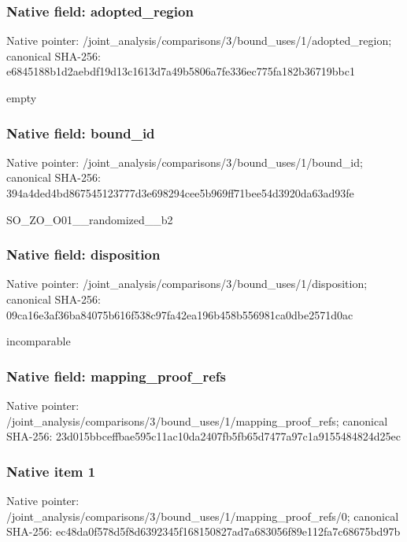 \documentclass[10pt,a4paper]{article}
\begin{document}
\subsubsection{Native field: adopted\_region}


Native pointer: /joint\_analysis/comparis\allowbreak{}ons/3/bound\_uses/1/adopt\allowbreak{}ed\_region; canonical SHA-256: e6845188b1d2aebdf19d13c1\allowbreak{}613d7a49b5806a7fe336ec77\allowbreak{}5fa182b36719bbc1


empty


\subsubsection{Native field: bound\_id}


Native pointer: /joint\_analysis/comparis\allowbreak{}ons/3/bound\_uses/1/bound\allowbreak{}\_id; canonical SHA-256: 394a4ded4bd867545123777d\allowbreak{}3e698294cee5b969ff71bee5\allowbreak{}4d3920da63ad93fe


SO\_ZO\_O01\_\_randomized\_\_b2


\subsubsection{Native field: disposition}


Native pointer: /joint\_analysis/comparis\allowbreak{}ons/3/bound\_uses/1/dispo\allowbreak{}sition; canonical SHA-256: 09ca16e3af36ba84075b616f\allowbreak{}538c97fa42ea196b458b5569\allowbreak{}81ca0dbe2571d0ac


incomparable


\subsubsection{Native field: mapping\_proof\_refs}


Native pointer: /joint\_analysis/comparis\allowbreak{}ons/3/bound\_uses/1/mappi\allowbreak{}ng\_proof\_refs; canonical SHA-256: 23d015bbceffbae595c11ac1\allowbreak{}0da2407fb5fb65d7477a97c1\allowbreak{}a9155484824d25ec



\subsubsection{Native item 1}


Native pointer: /joint\_analysis/comparis\allowbreak{}ons/3/bound\_uses/1/mappi\allowbreak{}ng\_proof\_refs/0; canonical SHA-256: ec48da0f578d5f8d6392345f\allowbreak{}168150827ad7a683056f89e1\allowbreak{}12fa7c68675bd97b
\end{document}
